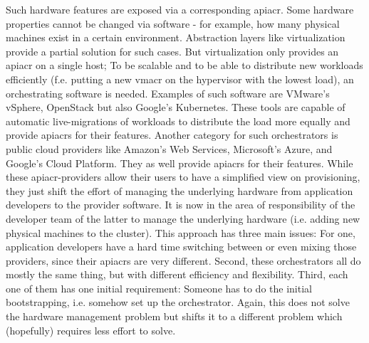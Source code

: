 
Such hardware features are exposed via a corresponding \gls{apiacr}. Some hardware properties cannot be changed via software - for example, how many physical machines exist in a certain environment. Abstraction layers like virtualization provide a partial solution for such cases.
\newline
But virtualization only provides an \gls{apiacr} on a single host; To be scalable and to be able to distribute new workloads efficiently (f.e. putting a new \gls{vmacr} on the hypervisor with the lowest load), an orchestrating software is needed. Examples of such software are VMware's vSphere, OpenStack but also Google's Kubernetes.
\newline
These tools are capable of automatic live-migrations of workloads to distribute the load more equally and provide \gls{apiacr}s for their features.
\newline
Another category for such orchestrators is public cloud providers like Amazon's Web Services, Microsoft's Azure, and Google's Cloud Platform. They as well provide \gls{apiacr}s for their features.
\newline
While these \gls{apiacr}-providers allow their users to have a simplified view on provisioning, they just shift the effort of managing the underlying hardware from application developers to the provider software. It is now in the area of responsibility of the developer team of the latter to manage the underlying hardware (i.e. adding new physical machines to the cluster).
\newline
This approach has three main issues: For one, application developers have a hard time switching between or even mixing those providers, since their \gls{apiacr}s are very different. Second, these orchestrators all do mostly the same thing, but with different efficiency and flexibility. Third, each one of them has one initial requirement: Someone has to do the initial bootstrapping, i.e. somehow set up the orchestrator. Again, this does not solve the hardware management problem but shifts it to a different problem which (hopefully) requires less effort to solve.
